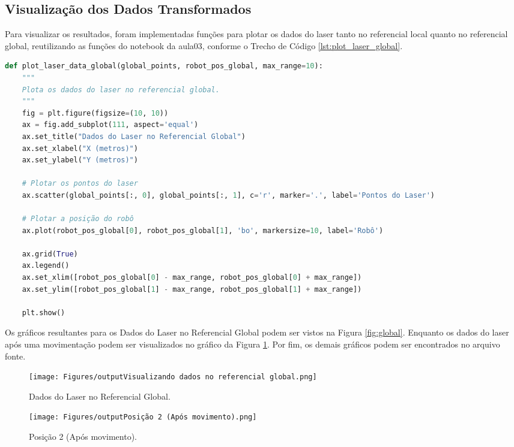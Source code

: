 \subsection{Visualização dos Dados Transformados} \label{subsec:visualizacao-dados}

Para visualizar os resultados, foram implementadas funções para plotar os dados do laser tanto no referencial local quanto no referencial global, reutilizando as funções do notebook da aula03, conforme o Trecho de Código \ref{lst:plot_laser_global}.

\begin{lstlisting}[language=Python, caption=Função para plotar dados do laser no referencial global., label=lst:plot_laser_global]
def plot_laser_data_global(global_points, robot_pos_global, max_range=10):
    """
    Plota os dados do laser no referencial global.
    """
    fig = plt.figure(figsize=(10, 10))
    ax = fig.add_subplot(111, aspect='equal')
    ax.set_title("Dados do Laser no Referencial Global")
    ax.set_xlabel("X (metros)")
    ax.set_ylabel("Y (metros)")

    # Plotar os pontos do laser
    ax.scatter(global_points[:, 0], global_points[:, 1], c='r', marker='.', label='Pontos do Laser')

    # Plotar a posição do robô
    ax.plot(robot_pos_global[0], robot_pos_global[1], 'bo', markersize=10, label='Robô')

    ax.grid(True)
    ax.legend()
    ax.set_xlim([robot_pos_global[0] - max_range, robot_pos_global[0] + max_range])
    ax.set_ylim([robot_pos_global[1] - max_range, robot_pos_global[1] + max_range])

    plt.show()
\end{lstlisting}

Os gráficos resultantes para os Dados do Laser no Referencial Global podem ser vistos na Figura \ref{fig:global}. Enquanto os dados do laser após uma movimentação podem ser visualizados no gráfico da Figura \ref{fig:movi}. Por fim, os demais gráficos podem ser encontrados no arquivo fonte.

\begin{figure}[H]
\centering
\begin{minipage}[b]{0.45\textwidth}
    \texttt{[image: Figures/outputVisualizando dados no referencial global.png]}
    \caption{Dados do Laser no Referencial Global.}
    \label{fig:global}
\end{minipage}
\hfill
\begin{minipage}[b]{0.45\textwidth}
    \texttt{[image: Figures/outputPosição 2 (Após movimento).png]}
    \caption{Posição 2 (Após movimento).}
    \label{fig:movi}
\end{minipage}
\end{figure}


